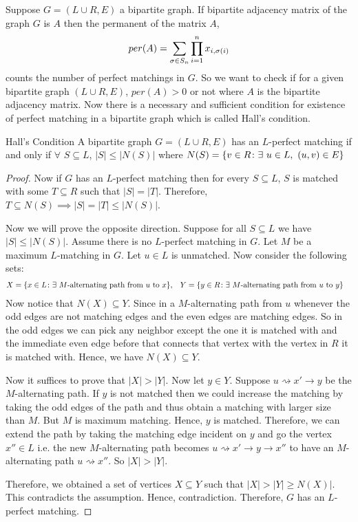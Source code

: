 Suppose $G=(L\cup R,E)$ a bipartite graph. If  bipartite adjacency matrix of the graph $G$ is $A$ then the permanent of the matrix $A$, $$per(A)=\sum\limits_{\sigma\in S_n}\prod_{i=1}^n x_{i,\sigma(i)}$$ counts the number of perfect matchings in $G$. So we want to check if for a given bipartite graph $(L\cup R,E)$, $per(A)>0$ or not where $A$ is the bipartite adjacency matrix. Now there is a necessary and sufficient condition for existence of perfect matching in a bipartite graph which is called Hall's condition.
\begin{Theorem}{Hall's Condition}{}
	A bipartite graph $G=(L\cup R,E)$ has an $L$-perfect matching if and only if $\forall $ $S\subseteq L$, $|S|\leq |N(S)|$ where $N(S)=\{v\in R\colon \exs\ u\in L,\ (u,v)\in E\}$
\end{Theorem}
\begin{proof}
	Now if $G$ has an $L$-perfect matching then for every $S\subseteq L$, $S$ is matched with some $T\subseteq R$ such that $|S|=|T|$. Therefore, $T\subseteq N(S)\implies |S|=|T|\leq |N(S)|$.

	Now we will prove the opposite direction. Suppose for all $S\subseteq L$ we have $|S|\leq |N(S)|$. Assume there is no $L$-perfect matching in $G$. Let $M$ be a maximum $L$-matching in $G$. Let $u\in L$ is unmatched. Now consider the following sets:\begin{align*}
		X & =\{x\in L\colon \exists\text{ $M$-alternating path from $u$ to $x$}\}, & Y & =\{y\in R\colon \exists\text{ $M$-alternating path from $u$ to $y$}\}
	\end{align*}
	Now notice that $N(X)\subseteq Y$. Since in a $M$-alternating path from $u$ whenever the odd edges are not matching edges and the even edges are matching edges. So in the odd edges we can pick any neighbor except the one it is matched with and the immediate even edge before that connects that vertex with the vertex in $R$ it is matched with. Hence, we have $N(X)\subseteq Y$.

	Now it suffices to prove that $|X|>|Y|$. Now let $y\in Y$. Suppose $u\rightsquigarrow x'\to y$ be the $M$-alternating path. If $y$ is not matched then we could increase the matching by taking the odd edges of the path and thus obtain a matching with larger size than $M$. But $M$ is maximum matching. Hence, $y$ is matched. Therefore, we can extend the path by taking the matching edge incident on $y$ and go the vertex $x''\in L$ i.e. the new $M$-alternating path becomes $u\rightsquigarrow x'\to y\to x''$ to have an $M$-alternating path $u\rightsquigarrow x''$. So $|X|>|Y|$.

	Therefore, we obtained a set of vertices $X\subseteq Y$ such that $|X|>|Y|\geq N(X)|$. This contradicts the assumption. Hence, contradiction. Therefore, $G$ has an $L$-perfect matching.
\end{proof}

